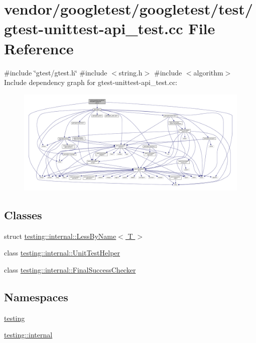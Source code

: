 \hypertarget{gtest-unittest-api__test_8cc}{}\section{vendor/googletest/googletest/test/gtest-\/unittest-\/api\+\_\+test.cc File Reference}
\label{gtest-unittest-api__test_8cc}
{\ttfamily \#include \char`\"{}gtest/gtest.\+h\char`\"{}}\newline
{\ttfamily \#include $<$string.\+h$>$}\newline
{\ttfamily \#include $<$algorithm$>$}\newline
Include dependency graph for gtest-\/unittest-\/api\+\_\+test.cc\+:
\nopagebreak
\begin{figure}[H]
\begin{center}
\leavevmode
\includegraphics[width=350pt]{gtest-unittest-api__test_8cc__incl}
\end{center}
\end{figure}
\subsection*{Classes}
\begin{DoxyCompactItemize}
\item 
struct \hyperlink{structtesting_1_1internal_1_1_less_by_name}{testing\+::internal\+::\+Less\+By\+Name$<$ T $>$}
\item 
class \hyperlink{classtesting_1_1internal_1_1_unit_test_helper}{testing\+::internal\+::\+Unit\+Test\+Helper}
\item 
class \hyperlink{classtesting_1_1internal_1_1_final_success_checker}{testing\+::internal\+::\+Final\+Success\+Checker}
\end{DoxyCompactItemize}
\subsection*{Namespaces}
\begin{DoxyCompactItemize}
\item 
 \hyperlink{namespacetesting}{testing}
\item 
 \hyperlink{namespacetesting_1_1internal}{testing\+::internal}
\end{DoxyCompactItemize}
